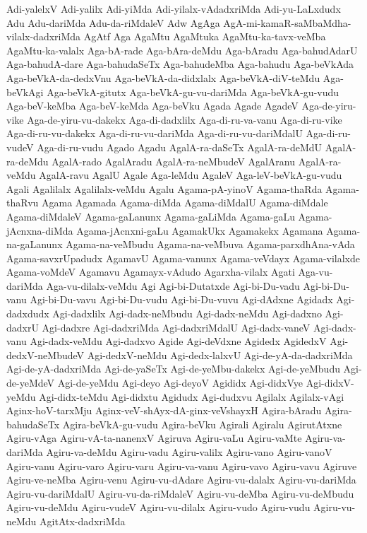 {Adi-yalelxV
Adi-yalilx
Adi-yiMda
Adi-yilalx-vAdadxriMda
Adi-yu-LaLxdudx
Adu
Adu-dariMda
Adu-da-riMdaleV
Adw
AgAga
AgA-mi-kamaR-saMbaMdha-vilalx-dadxriMda
AgAtf
Aga
AgaMtu
AgaMtuka
AgaMtu-ka-tavx-veMba
AgaMtu-ka-valalx
Aga-bA-rade
Aga-bAra-deMdu
Aga-bAradu
Aga-bahudAdarU
Aga-bahudA-dare
Aga-bahudaSeTx
Aga-bahudeMba
Aga-bahudu
Aga-beVkAda
Aga-beVkA-da-dedxVnu
Aga-beVkA-da-didxlalx
Aga-beVkA-diV-teMdu
Aga-beVkAgi
Aga-beVkA-gitutx
Aga-beVkA-gu-vu-dariMda
Aga-beVkA-gu-vudu
Aga-beV-keMba
Aga-beV-keMda
Aga-beVku
Agada
Agade
AgadeV
Aga-de-yiru-vike
Aga-de-yiru-vu-dakekx
Aga-di-dadxlilx
Aga-di-ru-va-vanu
Aga-di-ru-vike
Aga-di-ru-vu-dakekx
Aga-di-ru-vu-dariMda
Aga-di-ru-vu-dariMdalU
Aga-di-ru-vudeV
Aga-di-ru-vudu
Agado
Agadu
AgalA-ra-daSeTx
AgalA-ra-deMdU
AgalA-ra-deMdu
AgalA-rado
AgalAradu
AgalA-ra-neMbudeV
AgalAranu
AgalA-ra-veMdu
AgalA-ravu
AgalU
Agale
Aga-leMdu
AgaleV
Aga-leV-beVkA-gu-vudu
Agali
Agalilalx
Agalilalx-veMdu
Agalu
Agama-pA-yinoV
Agama-thaRda
Agama-thaRvu
Agama
Agamada
Agama-diMda
Agama-diMdalU
Agama-diMdale
Agama-diMdaleV
Agama-gaLanunx
Agama-gaLiMda
Agama-gaLu
Agama-jAcnxna-diMda
Agama-jAcnxni-gaLu
AgamakUkx
Agamakekx
Agamana
Agama-na-gaLanunx
Agama-na-veMbudu
Agama-na-veMbuva
Agama-parxdhAna-vAda
Agama-savxrUpadudx
AgamavU
Agama-vanunx
Agama-veVdayx
Agama-vilalxde
Agama-voMdeV
Agamavu
Agamayx-vAdudo
Agarxha-vilalx
Agati
Aga-vu-dariMda
Aga-vu-dilalx-veMdu
Agi
Agi-bi-Dutatxde
Agi-bi-Du-vadu
Agi-bi-Du-vanu
Agi-bi-Du-vavu
Agi-bi-Du-vudu
Agi-bi-Du-vuvu
Agi-dAdxne
Agidadx
Agi-dadxdudx
Agi-dadxlilx
Agi-dadx-neMbudu
Agi-dadx-neMdu
Agi-dadxno
Agi-dadxrU
Agi-dadxre
Agi-dadxriMda
Agi-dadxriMdalU
Agi-dadx-vaneV
Agi-dadx-vanu
Agi-dadx-veMdu
Agi-dadxvo
Agide
Agi-deVdxne
Agidedx
AgidedxV
Agi-dedxV-neMbudeV
Agi-dedxV-neMdu
Agi-dedx-lalxvU
Agi-de-yA-da-dadxriMda
Agi-de-yA-dadxriMda
Agi-de-yaSeTx
Agi-de-yeMbu-dakekx
Agi-de-yeMbudu
Agi-de-yeMdeV
Agi-de-yeMdu
Agi-deyo
Agi-deyoV
Agididx
Agi-didxVye
Agi-didxV-yeMdu
Agi-didx-teMdu
Agi-didxtu
Agidudx
Agi-dudxvu
Agilalx
Agilalx-vAgi
Aginx-hoV-tarxMju
Aginx-veV-shAyx-dA-ginx-veVshayxH
Agira-bAradu
Agira-bahudaSeTx
Agira-beVkA-gu-vudu
Agira-beVku
Agirali
Agiralu
AgirutAtxne
Agiru-vAga
Agiru-vA-ta-nanenxV
Agiruva
Agiru-vaLu
Agiru-vaMte
Agiru-va-dariMda
Agiru-va-deMdu
Agiru-vadu
Agiru-valilx
Agiru-vano
Agiru-vanoV
Agiru-vanu
Agiru-varo
Agiru-varu
Agiru-va-vanu
Agiru-vavo
Agiru-vavu
Agiruve
Agiru-ve-neMba
Agiru-venu
Agiru-vu-dAdare
Agiru-vu-dalalx
Agiru-vu-dariMda
Agiru-vu-dariMdalU
Agiru-vu-da-riMdaleV
Agiru-vu-deMba
Agiru-vu-deMbudu
Agiru-vu-deMdu
Agiru-vudeV
Agiru-vu-dilalx
Agiru-vudo
Agiru-vudu
Agiru-vu-neMdu
AgitAtx-dadxriMda
}
